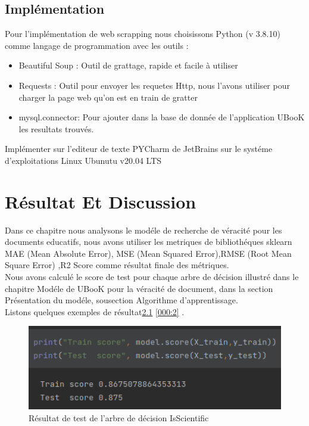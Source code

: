 \documentclass[12pt]{report}
\begin{document}
\section{Implémentation}

Pour l'implémentation de web scrapping nous choisissons Python (v 3.8.10) comme langage de programmation avec les outils : 
\begin{itemize}
\item Beautiful Soup : Outil de grattage, rapide et facile à utiliser
\item Requests : Outil pour envoyer les requetes Http, nous l'avons utiliser pour charger la page web qu'on est en train de gratter
\item mysql.connector: Pour ajouter dans la base de donnée de l'application UBooK les resultats trouvés.
\end{itemize}
Implémenter sur l'editeur de texte PYCharm de JetBrains sur le systéme d'exploitations Linux Ubunutu v20.04 LTS

\newpage
\chapter{Résultat Et Discussion}

Dans ce chapitre nous analysons le modéle de recherche de véracité pour les documents educatifs, 
nous avons utiliser les metriques de bibliothéques sklearn MAE (Mean Absolute Error), MSE (Mean Squared Error),RMSE (Root Mean Square Error) ,R2 Score comme résultat finale des métriques.\\
Nous avons calculé le score de test pour chaque arbre de décision illustré dans le chapitre Modéle de UBooK pour la véracité de document, dans la section Présentation du modéle, sousection Algorithme d'apprentissage.\\
Listons quelques exemples de résultat\ref{000 :1} \ref{000:2} .
\begin{figure}[!hbtp]
    \centering
    \includegraphics[width=1\textwidth]{isSientific}
    \caption{Résultat de test de l'arbre de décision IsScientific}
    \label{000 :1}
\end{figure}
\end{document}

